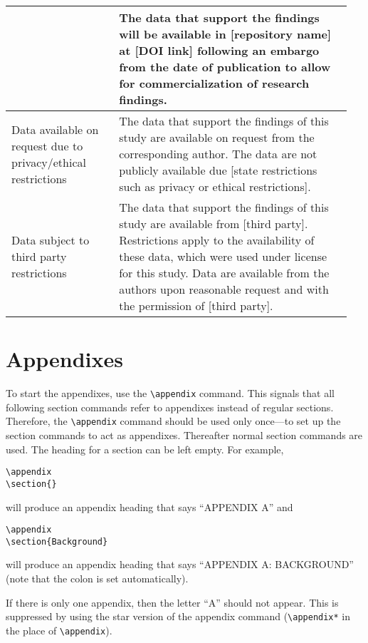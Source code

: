 \documentclass[%
 aip,
 amsmath,amssymb,
 reprint,%
]{revtex4-1}
\begin{document}
\begin{center}
\begin{tabular}{| >{\raggedright\arraybackslash}p{0.3\linewidth} | >{\raggedright\arraybackslash}p{0.65\linewidth} |}
&
The data that support the findings will be available in [repository name] at [DOI link] following an embargo from the date of publication to allow for commercialization of research findings.
\\\hline
Data available on request due to privacy/ethical restrictions
&
The data that support the findings of this study are available on request from the corresponding author. The data are not publicly available due [state restrictions such as privacy or ethical restrictions].
\\\hline
Data subject to third party restrictions
&
The data that support the findings of this study are available from [third party]. Restrictions apply to the availability of these data, which were used under license for this study. Data are available from the authors upon reasonable request and with the permission of [third party].
\\\hline
\end{tabular}
\end{center}

\appendix

\section{Appendixes}

To start the appendixes, use the \verb+\appendix+ command.
This signals that all following section commands refer to appendixes
instead of regular sections. Therefore, the \verb+\appendix+ command
should be used only once---to set up the section commands to act as
appendixes. Thereafter normal section commands are used. The heading
for a section can be left empty. For example,
\begin{verbatim}
\appendix
\section{}
\end{verbatim}
will produce an appendix heading that says ``APPENDIX A'' and
\begin{verbatim}
\appendix
\section{Background}
\end{verbatim}
will produce an appendix heading that says ``APPENDIX A: BACKGROUND''
(note that the colon is set automatically).

If there is only one appendix, then the letter ``A'' should not
appear. This is suppressed by using the star version of the appendix
command (\verb+\appendix*+ in the place of \verb+\appendix+).
\end{document}
